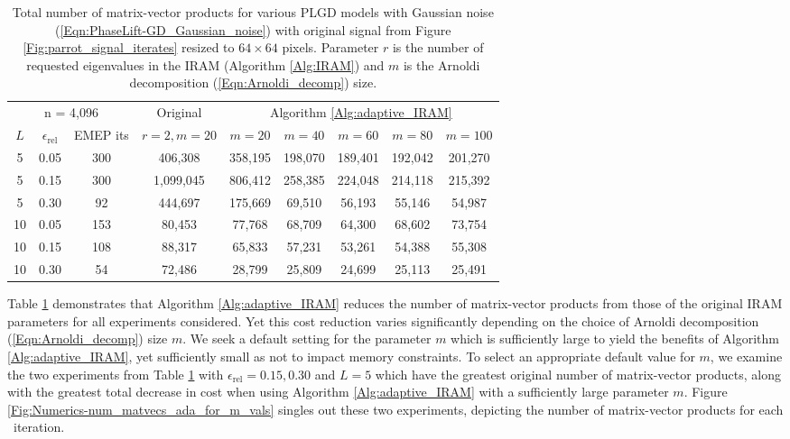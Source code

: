 \begin{table}[H]
\centering
\begin{tabular}{ |ccc|c|ccccc| }
 \hline
			  \multicolumn{3}{|c|}{n = 4,096} &  Original
			&  \multicolumn{5}{c|}{Algorithm \ref{Alg:adaptive_IRAM}}	\\
$L$ & $\epsilon_\text{rel}$ & EMEP its & $r=2, m=20$	& $m=20$  & $m=40$  & $m=60$  & $m=80$  & $m=100$   \\
 \hline
  5 &  0.05 & 300 &  406,308  &  358,195  &  198,070  &  189,401  &  192,042  &  201,270  \\ 
  5 &  0.15 & 300 & 1,099,045  &  806,412  &  258,385  &  224,048  &  214,118  &  215,392  \\ 
  5 &  0.30 &  92 &  444,697  &  175,669  &   69,510  &   56,193  &   55,146  &   54,987  \\ 
 10 &  0.05 & 153 &   80,453  &   77,768  &   68,709  &   64,300  &   68,602  &   73,754  \\ 
 10 &  0.15 & 108 &   88,317  &   65,833  &   57,231  &   53,261  &   54,388  &   55,308  \\ 
 10 &  0.30 &  54 &   72,486  &   28,799  &   25,809  &   24,699  &   25,113  &   25,491  \\ 
 \hline
\end{tabular}

\caption{
Total number of matrix-vector products for various PLGD models with Gaussian noise	(\ref{Eqn:PhaseLift-GD_Gaussian_noise}) with original signal from Figure \ref{Fig:parrot_signal_iterates} resized to $64 \times 64$ pixels.
Parameter $r$ is the number of requested eigenvalues in the IRAM (Algorithm \ref{Alg:IRAM}) and $m$ is the Arnoldi decomposition (\ref{Eqn:Arnoldi_decomp}) size. 
} \label{Tab:Numerics-num_matvecs_orig_vs_ada}
\end{table}



Table \ref{Tab:Numerics-num_matvecs_orig_vs_ada} demonstrates that Algorithm \ref{Alg:adaptive_IRAM} reduces the number of matrix-vector products from those of the original IRAM parameters for all experiments considered.
Yet this cost reduction varies significantly depending on the choice of Arnoldi decomposition (\ref{Eqn:Arnoldi_decomp}) size $m$.
We seek a default setting for the parameter $m$ which is sufficiently large to yield the benefits of Algorithm \ref{Alg:adaptive_IRAM}, yet sufficiently small as not to impact memory constraints.
To select an appropriate default value for $m$, we examine the two experiments from Table \ref{Tab:Numerics-num_matvecs_orig_vs_ada} with $\epsilon_\text{rel} = 0.15, 0.30$ and $L=5$ which have the greatest original number of matrix-vector products, along with the greatest total decrease in cost when using Algorithm \ref{Alg:adaptive_IRAM} with a sufficiently large parameter $m$.
Figure \ref{Fig:Numerics-num_matvecs_ada_for_m_vals} singles out these two experiments, depicting the number of matrix-vector products for each \emep \ iteration.

